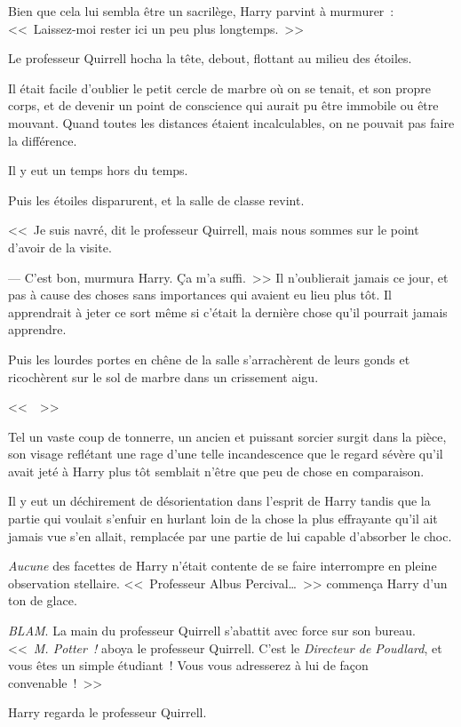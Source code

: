 Bien que cela lui sembla être un sacrilège, Harry parvint à murmurer~: <<~Laissez-moi rester ici un peu plus longtemps.~>>

Le professeur Quirrell hocha la tête, debout, flottant au milieu des étoiles.

Il était facile d'oublier le petit cercle de marbre où on se tenait, et son propre corps, et de devenir un point de conscience qui aurait pu être immobile ou être mouvant. Quand toutes les distances étaient incalculables, on ne pouvait pas faire la différence.

Il y eut un temps hors du temps.

Puis les étoiles disparurent, et la salle de classe revint.

<<~Je suis navré, dit le professeur Quirrell, mais nous sommes sur le point d'avoir de la visite.

--- C'est bon, murmura Harry. Ça m'a suffi.~>> Il n'oublierait jamais ce jour, et pas à cause des choses sans importances qui avaient eu lieu plus tôt. Il apprendrait à jeter ce sort même si c'était la dernière chose qu'il pourrait jamais apprendre.

Puis les lourdes portes en chêne de la salle s'arrachèrent de leurs gonds et ricochèrent sur le sol de marbre dans un crissement aigu.

<<~~>>

Tel un vaste coup de tonnerre, un ancien et puissant sorcier surgit dans la pièce, son visage reflétant une rage d'une telle incandescence que le regard sévère qu'il avait jeté à Harry plus tôt semblait n'être que peu de chose en comparaison.

Il y eut un déchirement de désorientation dans l'esprit de Harry tandis que la partie qui voulait s'enfuir en hurlant loin de la chose la plus effrayante qu'il ait jamais vue s'en allait, remplacée par une partie de lui capable d'absorber le choc.

\emph{Aucune} des facettes de Harry n'était contente de se faire interrompre en pleine observation stellaire. <<~Professeur Albus Percival…~>> commença Harry d'un ton de glace.

\emph{BLAM}. La main du professeur Quirrell s'abattit avec force sur son bureau. <<~\emph{M. Potter~!} aboya le professeur Quirrell. C'est le \emph{Directeur de Poudlard}, et vous êtes un simple étudiant~! Vous vous adresserez à lui de façon convenable~!~>>

Harry regarda le professeur Quirrell.

